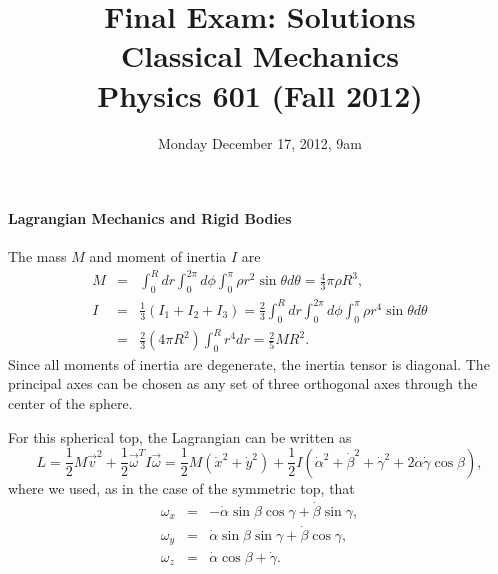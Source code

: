 \documentclass[letterpaper,11pt]{article}
\title{Final Exam: Solutions \\ Classical Mechanics \\ Physics 601 (Fall 2012)}
\date{Monday December 17, 2012, 9am}
\begin{document}
\maketitle

\paragraph*{Lagrangian Mechanics and Rigid Bodies}
The mass $M$ and moment of inertia $I$ are
\begin{eqnarray*}
 M & = & \int_0^R dr \int_0^{2\pi} d\phi \int_0^\pi \rho r^2\sin\theta d\theta = \frac{4}{3}\pi \rho R^3, \\
 I & = & \frac{1}{3} (I_1 + I_2 + I_3) = \frac{2}{3} \int_0^R dr \int_0^{2\pi} d\phi \int_0^\pi \rho r^4\sin\theta d\theta \\
 & = & \frac{2}{3} (4\pi R^2) \int_0^R r^4 dr = \frac{2}{5} M R^2.
\end{eqnarray*}
Since all moments of inertia are degenerate, the inertia tensor is diagonal.  The principal axes can be chosen as any set of three orthogonal axes through the center of the sphere.

For this spherical top, the Lagrangian can be written as
\begin{equation*}
 L = \frac{1}{2} M \vec{v}^2 + \frac{1}{2} \vec\omega^T I \vec\omega = \frac{1}{2} M (\dot{x}^2 + \dot{y}^2) + \frac{1}{2} I \left( \dot\alpha^2 + \dot\beta^2 + \dot\gamma^2 + 2 \dot\alpha \dot\gamma \cos\beta \right),
\end{equation*}
where we used, as in the case of the symmetric top, that
\begin{eqnarray*}
 \omega_x & = & -\dot\alpha \sin\beta \cos\gamma + \dot\beta \sin\gamma, \\
 \omega_y & = &  \dot\alpha \sin\beta \sin\gamma + \dot\beta \cos\gamma, \\
 \omega_z & = &  \dot\alpha \cos\beta + \dot\gamma.
\end{eqnarray*}
\end{document}
